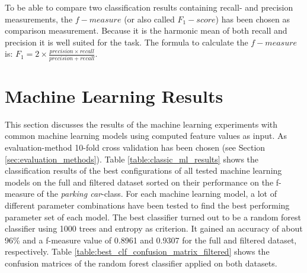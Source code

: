 To be able to compare two classification results containing recall- and precision measurements, the $f-measure$ (or also called $F_1-score$) has been chosen as comparison measurement. Because it is the harmonic mean of both recall and precision it is well suited for the task. The formula to calculate the $f-measure$ is: $F_1 = 2 \times \frac{precision \times recall}{precision + recall}$.






\section{Machine Learning Results}
\label{sec:machine_learning_results}

This section discusses the results of the machine learning experiments with common machine learning models using computed feature values as input. As evaluation-method 10-fold cross validation has been chosen (see Section \ref{sec:evaluation_methods}). 
Table \ref{table:classic_ml_results} shows the classification results of the best configurations of all tested machine learning models on the full and filtered dataset sorted on their performance on the f-measure of the \emph{parking car}-class. For each machine learning model, a lot of different parameter combinations have been tested to find the best performing parameter set of each model. The best classifier turned out to be a random forest classifier using 1000 trees and entropy as criterion. It gained an accuracy of about 96\% and a f-measure value of 0.8961 and 0.9307 for the full and filtered dataset, respectively. Table \ref{table:best_clf_confusion_matrix_filtered} shows the confusion matrices of the random forest classifier applied on both datasets. 


